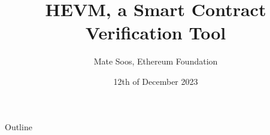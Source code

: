 \documentclass[aspectratio=169]{beamer}
\title{HEVM, a Smart Contract Verification Tool}
\author{Mate Soos, Ethereum Foundation}
\date{12th of December 2023}
\begin{document}
\begin{frame}
    \titlepage 
\end{frame}

%

\begin{frame}{Outline}
    \tableofcontents
\end{frame}


\end{document}
